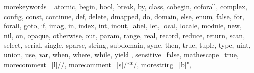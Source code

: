   {
    morekeywords={
      atomic,
      begin, bool, break, by,
      class, cobegin, coforall, complex, config, const, continue,
      def, delete, dmapped, do, domain,
      else, enum,
      false, for, forall,
      goto,
      if, imag, in, index, int, inout,
      label, let, local, locale,
      module,
      new, nil,
      on, opaque, otherwise, out,
      param,
      range, real, record, reduce, return,
      scan, select, serial, single, sparse, string, subdomain, sync,
      then, true, tuple, type,
      uint, union, use,
      var,
      when, where, while,
      yield
    },
    sensitive=false,
    mathescape=true,
    morecomment=[l]{//},
    morecomment=[s]{/*}{*/},
    morestring=[b]",
}

\lstset{
    basicstyle=\footnotesize\ttfamily,
    keywordstyle=\bfseries,
    commentstyle=\em,
    showstringspaces=false,
    flexiblecolumns=false,
    language=chapel,
  }

\newcommand{\chpl}[1]{\lstinline[language=chapel,basicstyle=\small\ttfamily,keywordstyle=]!#1!}


\newcommand{\cc}[1]{\lstinline[language=c,basicstyle=\small\ttfamily,keywordstyle=]!#1!}
